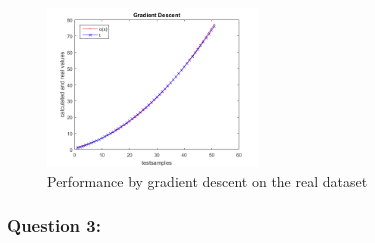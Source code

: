 \begin{figure}[!ht]
	\centering
	\includegraphics[width=0.5\textwidth]{img/gradientDescent}
	\caption{Performance by gradient descent on the real dataset}
	\label{perGraDescent}
\end{figure}



\subsubsection{Question 3: }





